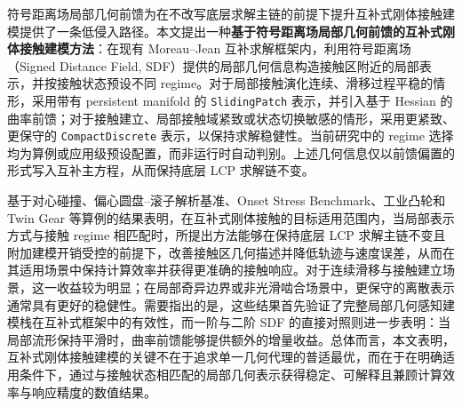 符号距离场局部几何前馈为在不改写底层求解主链的前提下提升互补式刚体接触建模提供了一条低侵入路径。本文提出一种\textbf{基于符号距离场局部几何前馈的互补式刚体接触建模方法}：在现有 Moreau--Jean 互补求解框架内，利用符号距离场（Signed Distance Field, SDF）提供的局部几何信息构造接触区附近的局部表示，并按接触状态预设不同 regime。对于局部接触演化连续、滑移过程平稳的情形，采用带有 persistent manifold 的 \texttt{SlidingPatch} 表示，并引入基于 Hessian 的曲率前馈；对于接触建立、局部接触域紧致或状态切换敏感的情形，采用更紧致、更保守的 \texttt{CompactDiscrete} 表示，以保持求解稳健性。当前研究中的 regime 选择均为算例或应用级预设配置，而非运行时自动判别。上述几何信息仅以前馈偏置的形式写入互补主方程，从而保持底层 LCP 求解链不变。

基于对心碰撞、偏心圆盘--滚子解析基准、Onset Stress Benchmark、工业凸轮和 Twin Gear 等算例的结果表明，在互补式刚体接触的目标适用范围内，当局部表示方式与接触 regime 相匹配时，所提出方法能够在保持底层 LCP 求解主链不变且附加建模开销受控的前提下，改善接触区几何描述并降低轨迹与速度误差，从而在其适用场景中保持计算效率并获得更准确的接触响应。对于连续滑移与接触建立场景，这一收益较为明显；在局部奇异边界或非光滑啮合场景中，更保守的离散表示通常具有更好的稳健性。需要指出的是，这些结果首先验证了完整局部几何感知建模栈在互补式框架中的有效性，而一阶与二阶 SDF 的直接对照则进一步表明：当局部流形保持平滑时，曲率前馈能够提供额外的增量收益。总体而言，本文表明，互补式刚体接触建模的关键不在于追求单一几何代理的普适最优，而在于在明确适用条件下，通过与接触状态相匹配的局部几何表示获得稳定、可解释且兼顾计算效率与响应精度的数值结果。
